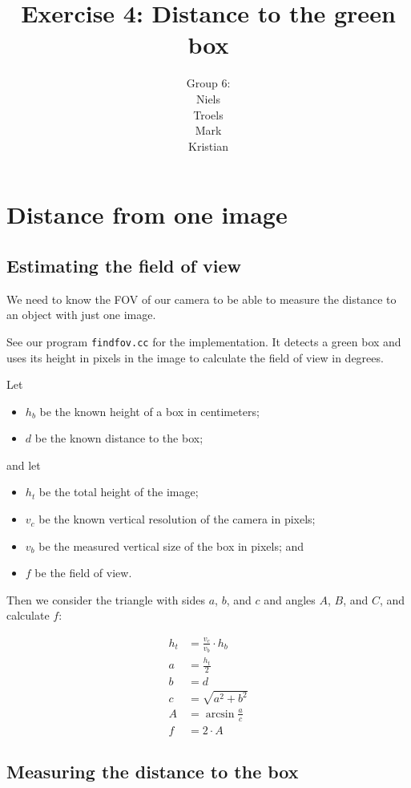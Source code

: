 \documentclass[a4paper,12pt]{article}
\title{Exercise 4: Distance to the green box}
\author{Group 6:\\Niels\\Troels\\Mark\\Kristian}
\begin{document}
\maketitle

\section{Distance from one image}

\subsection{Estimating the field of view}

We need to know the FOV of our camera to be able to measure the distance to an
object with just one image.

See our program \texttt{findfov.cc} for the implementation.  It detects a green
box and uses its height in pixels in the image to calculate the field of view in
degrees.

Let
\begin{itemize}
\item $h_b$ be the known height of a box in centimeters;
\item $d$ be the known distance to the box;
\end{itemize}

and let
\begin{itemize}
\item $h_t$ be the total height of the image;
\item $v_c$ be the known vertical resolution of the camera in pixels;
\item $v_b$ be the measured vertical size of the box in pixels; and
\item $f$ be the field of view.
\end{itemize}

Then we consider the triangle with sides $a$, $b$, and $c$ and angles $A$, $B$,
and $C$, and calculate $f$:

\begin{align*}
  h_t &= \frac{v_c}{v_b} \cdot h_b\\
  a &= \frac{h_t}{2}\\
  b &= d\\
  c &= \sqrt{a^2 + b^2}\\
  A &= \arcsin \frac{a}{c}\\
  f &= 2 \cdot A
\end{align*}


\subsection{Measuring the distance to the box}
\end{document}

